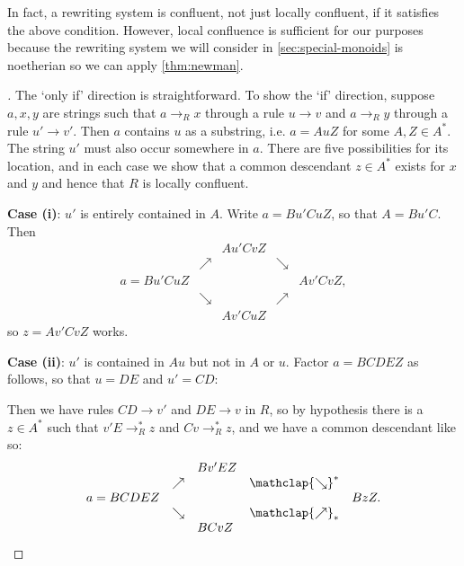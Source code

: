 \documentclass[noindex,noinsetproof,emphthm,12pt]{lmaths}
\newcommand{\nearrowstar}{\mathclap{\nearrow}_{*}}
\newcommand{\searrowstar}{\mathclap{\searrow}^{*}}
\begin{document}
In fact, a rewriting system is confluent, not just locally confluent, if it satisfies the above condition. However, local confluence is sufficient for our purposes because the rewriting system we will consider in \cref{sec:special-monoids} is noetherian so we can apply \cref{thm:newman}.

\begin{proof}[ ]
	The `only if' direction is straightforward. To show the `if' direction, suppose $a, x, y$ are strings such that $a \to_R x$ through a rule $u \to v$ and $a \to_R y$ through a rule $u' \to v'$. Then $a$ contains $u$ as a substring, i.e. $a = AuZ$ for some $A, Z \in A^*$. The string $u'$ must also occur somewhere in $a$. There are five possibilities for its location, and in each case we show that a common descendant $z \in A^*$ exists for $x$ and $y$ and hence that $R$ is locally confluent.

	\textbf{Case (i)}: $u'$ is entirely contained in $A$. Write $a = Bu'CuZ$, so that $A = Bu'C$. Then \[
		\begin{array}{lllll}
			& & Au'CvZ & & \\
			& \nearrow & & \searrow & \\
			a = Bu'CuZ & & & & Av'CvZ, \\
			& \searrow & & \nearrow & \\
			& & Av'CuZ & &
		\end{array}
	\]
	so $z = Av'CvZ$ works.

	\textbf{Case (ii)}: $u'$ is contained in $Au$ but not in $A$ or $u$. Factor $a = BCDEZ$ as follows, so that $u = DE$ and $u' = CD$:

	{\centering
	\par}

	Then we have rules $CD \to v'$ and $DE \to v$ in $R$, so by hypothesis there is a $z \in A^*$ such that $v'E \to^*_R z$ and $Cv \to^*_R z$, and we have a common descendant like so: \[
		\begin{array}{lllll}
			& & Bv'EZ & & \\
			& \nearrow & & \searrowstar & \\
			a = BCDEZ & & & & BzZ. \\
			& \searrow & & \nearrowstar & \\
			& & BCvZ & &
		\end{array}
	\]


\end{proof}
\end{document}
